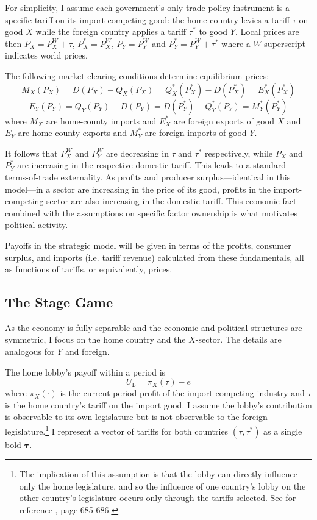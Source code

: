 \documentclass[authoryear, review]{elsarticle}
\begin{document}
For simplicity, I assume each government's only trade policy instrument is a specific tariff on its import-competing good: the home country levies a tariff $\tau$ on good $X$ while the foreign country applies a tariff $\tau^*$ to good $Y$. Local prices are then $P_X = P_X^W + \tau$, $P_X^* = P_X^W$, $P_Y = P_Y^W$ and $P_Y^* = P_Y^W + \tau^*$ where a $W$ superscript indicates world prices.

The following market clearing conditions determine equilibrium prices:
$$M_X(P_X)= D(P_X)-Q_X(P_X) = Q_X^*(P_X^*) - D(P_X^*) = E_X^*(P_X^*)$$
$$E_Y(P_Y)=Q_Y(P_Y)-D(P_Y) = D(P_Y^*)-Q_Y^*(P_Y) = M_Y^*(P_Y^*)$$
where $M_X$ are home-county imports and $E_X^*$ are foreign exports of good $X$ and $E_Y$ are home-county exports and $M_Y^*$ are foreign imports of good $Y$.

It follows that $P_X^W$ and $P_Y^W$ are decreasing in $\tau$ and $\tau^*$ respectively, while $P_X$ and $P_Y^*$ are increasing in the respective domestic tariff. This leads to a standard terms-of-trade externality. As profits and producer surplus---identical in this model---in a sector are increasing in the price of its good, profits in the import-competing sector are also increasing in the domestic tariff. This economic fact combined with the assumptions on specific factor ownership is what motivates political activity.

Payoffs in the strategic model will be given in terms of the profits, consumer surplus, and imports (i.e. tariff revenue) calculated from these fundamentals, all as functions of tariffs, or equivalently, prices.

\subsection{The Stage Game}
\label{sec:stage}
As the economy is fully separable and the economic and political structures are symmetric, I focus on the home country and the $X$-sector. The details are analogous for $Y$ and foreign.

The home lobby's payoff within a period is
\begin{equation}
  U_\text{L} = \pi_X(\tau)-e
  \label{eq:lv3}
\end{equation}
where $\pi_X(\cdot)$ is the current-period profit of the import-competing industry and $\tau$ is the home country's tariff on the import good. I assume the lobby's contribution is observable to its own legislature but is not observable to the foreign legislature.\footnote{The implication of this assumption is that the lobby can directly influence only the home legislature, and so the influence of one country's lobby on the other country's legislature occurs only through the tariffs selected. See for reference \citet{gh95}, page 685-686.} I represent a vector of tariffs for both countries $(\tau,\tau^*)$ as a single bold $\bm{\tau}$. 
\end{document}
